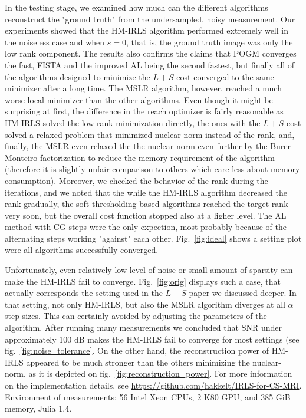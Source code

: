 In the testing stage, we examined how much can the different algorithms reconstruct the "ground truth" from the undersampled, noisy measurement. Our experiments showed that the HM-IRLS algorithm performed extremely well in the noiseless case and when $s = 0$, that is, the ground truth image was only the low rank component. The results also confirms the claims that POGM converges the fast, FISTA and the improved AL being the second fastest, but finally all of the algorithms designed to minimize the $L+S$ cost converged to the same minimizer after a long time. The MSLR algorithm, however, reached a much worse local minimizer than the other algorithms. Even though it might be surprising at first, the difference in the reach optimizer is fairly reasonable as HM-IRLS solved the low-rank minimization directly, the ones with the $L+S$ cost solved a relaxed problem that minimized nuclear norm instead of the rank, and, finally, the MSLR even relaxed the the nuclear norm even further by the Burer-Monteiro factorization to reduce the memory requirement of the algorithm (therefore it is slightly unfair comparison to others which care less about memory consumption). Moreover, we checked the behavior of the rank during the iterations, and we noted that the while the HM-IRLS algorithm decreased the rank gradually, the soft-thresholding-based algorithms reached the target rank very soon, but the overall cost function stopped also at a ligher level. The AL method with CG steps were the only expection, most probably because of the alternating steps working "against" each other. Fig.~\ref{fig:ideal} shows a setting plot were all algorithms successfully converged.

Unfortunately, even relatively low level of noise or small amount of sparsity can make the HM-IRLS fail to converge. Fig.~\ref{fig:orig} displays such a case, that actually corresponds the setting used in the $L+S$ paper we discussed deeper. In that setting, not only HM-IRLS, but also the MSLR algorithm diverges at all $\alpha$ step sizes. This can certainly avoided by adjusting the parameters of the algorithm. After running many measurements we concluded that SNR under approximately 100 dB makes the HM-IRLS fail to converge for most settings (see fig.~\ref{fig:noise_tolerance}. On the other hand, the reconstruction power of HM-IRLS appeared to be much stronger than the others minimizing the nuclear-norm, as it is depicted on fig.~\ref{fig:reconstruction_power}.
For more information on the implementation details, see \url{https://github.com/hakkelt/IRLS-for-CS-MRI}. Environment of measurements: 56 Intel Xeon CPUs, 2 K80 GPU, and 385 GiB memory, Julia 1.4.

